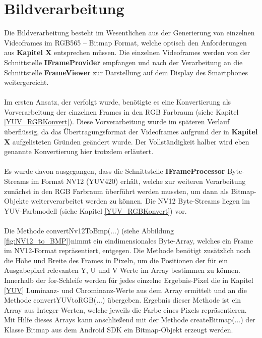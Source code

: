 \chapter{Bildverarbeitung}

Die Bildverarbeitung besteht im Wesentlichen aus der Generierung von einzelnen Videoframes im RGB565 – Bitmap Format, welche optisch den Anforderungen aus \textbf{Kapitel X} entsprechen müssen. Die einzelnen Videoframes werden von der Schnittstelle \textbf{IFrameProvider} empfangen und nach der Verarbeitung an die Schnittstelle \textbf{FrameViewer} zur Darstellung auf dem Display des Smartphones weitergereicht.
\\
\\
Im ersten Ansatz, der verfolgt wurde, benötigte es eine Konvertierung als Vorverarbeitung der einzelnen Frames in den RGB Farbraum (siehe Kapitel \ref{YUV_RGBKonvert}). Diese Vorverarbeitung wurde im späteren Verlauf überflüssig, da das Übertragungsformat der Videoframes aufgrund der in \textbf{Kapitel X} aufgelisteten Gründen geändert wurde. Der Vollständigkeit halber wird eben genannte Konvertierung hier trotzdem erläutert.
\\
\\
Es wurde davon ausgegangen, dass die Schnittstelle \textbf{IFrameProcessor} Byte-Streams im Format NV12 (YUV420) erhält, welche zur weiteren Verarbeitung zunächst in den RGB Farbraum überführt werden mussten, um dann als Bitmap-Objekte weiterverarbeitet werden zu können. Die NV12 Byte-Streams liegen im YUV-Farbmodell (siehe Kapitel \ref{YUV_RGBKonvert}) vor. 
\\
\\
Die Methode convertNv12ToBmp(...) (siehe Abbildung \ref{fig:NV12_to_BMP})nimmt ein eindimensionales Byte-Array, welches ein Frame im NV12-Format repräsentiert, entgegen. Die Methode benötigt zusätzlich noch die Höhe und Breite des Frames in Pixeln, um die Positionen der für ein Ausgabepixel relevanten Y, U und V Werte im Array bestimmen zu können. Innerhalb der for-Schleife werden für jedes einzelne Ergebnis-Pixel die in Kapitel \ref{YUV} Luminanz- und Chrominanz-Werte aus dem Array ermittelt und an die Methode convertYUVtoRGB(...) übergeben. Ergebnis dieser Methode ist ein Array aus Integer-Werten, welche jeweils die Farbe eines Pixels repräsentieren. Mit Hilfe dieses Arrays kann anschließend mit der Methode createBitmap(...) der Klasse Bitmap aus dem Android SDK ein Bitmap-Objekt erzeugt werden. 
\clearpage

